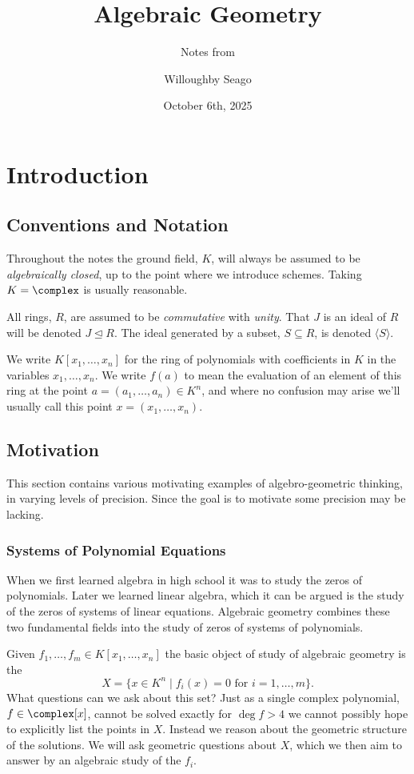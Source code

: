 \documentclass[fleqn]{NotesClass}
\title{Algebraic Geometry}
\author{Willoughby Seago}
\date{October 6th, 2025}
\subtitle{Notes from}
\newcommand{\subideal}{\trianglelefteq}
\begin{document}
    \frontmatter
    \titlepage
    \innertitlepage{}
    \tableofcontents
    \mainmatter
    
    \chapter{Introduction}
    
    \section{Conventions and Notation}
    Throughout the notes the ground field, \(K\), will always be assumed to be \emph{algebraically closed}, up to the point where we introduce schemes.
    Taking \(K = \complex\) is usually reasonable.
    
    All rings, \(R\), are assumed to be \emph{commutative} with \emph{unity}.
    That \(J\) is an ideal of \(R\) will be denoted \(J \subideal R\).
    The ideal generated by a subset, \(S \subseteq R\), is denoted \(\langle S \rangle\).
    
    We write \(K[x_1, \dotsc, x_n]\) for the ring of polynomials with coefficients in \(K\) in the variables \(x_1, \dotsc, x_n\).
    We write \(f(a)\) to mean the evaluation of an element of this ring at the point \(a = (a_1, \dotsc, a_n) \in K^n\), and where no confusion may arise we'll usually call this point \(x = (x_1, \dotsc, x_n)\).
    
    \section{Motivation}
    This section contains various motivating examples of algebro-geometric thinking, in varying levels of precision.
    Since the goal is to motivate some precision may be lacking.
    
    \subsection{Systems of Polynomial Equations}
    When we first learned algebra in high school it was to study the zeros of polynomials.
    Later we learned linear algebra, which it can be argued is the study of the zeros of systems of linear equations.
    Algebraic geometry combines these two fundamental fields into the study of zeros of systems of polynomials.
    
    Given \(f_1, \dotsc, f_m \in K[x_1, \dotsc, x_n]\) the basic object of study of algebraic geometry is the 
    \begin{equation}
        X = \{x \in K^n \mid f_i(x) = 0 \text{ for } i = 1, \dotsc, m\}.
    \end{equation}
    What questions can we ask about this set?
    Just as a single complex polynomial, \(f \in \complex[x]\), cannot be solved exactly for \(\deg f > 4\) we cannot possibly hope to explicitly list the points in \(X\).
    Instead we reason about the geometric structure of the solutions.
    We will ask geometric questions about \(X\), which we then aim to answer by an algebraic study of the \(f_i\).
    
\end{document}
